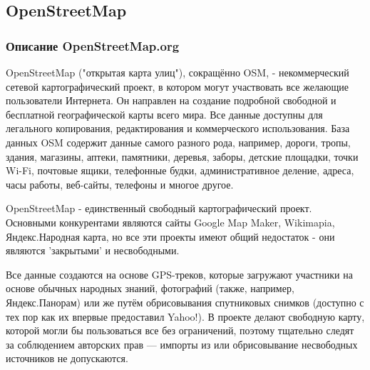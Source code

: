 \documentclass[12pt,a4paper,oneside]{article} %
\begin{document}
\newpage
\subsection{OpenStreetMap}
\subsubsection{Описание OpenStreetMap.org}

OpenStreetMap ("открытая карта улиц"), сокращённо OSM, - \linebreak
некоммерческий сетевой картографический проект, в котором могут \linebreak
участвовать все желающие пользователи Интернета. Он направлен на \linebreak
создание подробной свободной и бесплатной географической карты \linebreak
всего мира. Все данные доступны для легального копирования, \linebreak
редактирования и коммерческого использования. База данных OSM \linebreak
содержит данные самого разного рода, например, дороги, тропы, \linebreak
здания, магазины, аптеки, памятники, деревья, заборы, детские \linebreak
площадки, точки Wi-Fi, почтовые ящики, телефонные будки, \linebreak
административное деление, адреса, часы работы, веб-сайты, \linebreak
телефоны и многое другое.

OpenStreetMap - единственный свободный картографический проект.\linebreak
Основными конкурентами являются сайты Google Map Maker, \linebreak
Wikimapia, Яндекс.Народная карта, но все эти проекты имеют \linebreak
общий недостаток - они являются 'закрытыми' и несвободными.

Все данные создаются на основе GPS-треков, которые загружают \linebreak
участники на основе обычных народных знаний, фотографий (также,\linebreak
например, Яндекс.Панорам) или же путём обрисовывания \linebreak
спутниковых снимков (доступно с тех пор как их впервые \linebreak
предоставил Yahoo!). В проекте делают свободную карту, которой\linebreak
могли бы пользоваться все без ограничений, поэтому тщательно\linebreak
следят за соблюдением авторских прав — импорты из или\linebreak
обрисовывание несвободных источников не допускаются.
\end{document}
